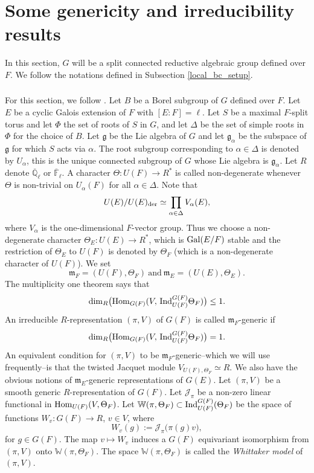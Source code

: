 \documentclass[10pt, reqno]{amsart}
\theoremstyle{plain}
\numberwithin{equation}{section} \newcommand{\di}{\operatorname{dim}}
\begin{document}
\section{Some genericity and irreducibility results}\label{sec_gen_irr}
\label{Tate_generic_subsection}
In this section, $G$ will be a
split connected reductive algebraic group defined over $F$. We follow the
notations defined in Subsection \ref{local_bc_setup}.
\subsubsection{}
For this section, we follow \cite{Derived_subgroups_Henniart_Bushnell}. 
Let $B$ be a Borel subgroup of $G$ defined over $F$.
Let $E$ be a cyclic Galois extension of $F$ with $[E:F]=\ell$.
Let $S$ be a maximal $F$-split torus and let $\Phi$ the set of roots
of $S$ in  $G$, and let $\Delta$ be the set of simple roots in
$\Phi$ for the choice of $B$. Let $\mathfrak{g}$ be the Lie algebra of
$G$ and let $\mathfrak{g}_\alpha$ be the subspace of $\mathfrak{g}$
for which $S$ acts via $\alpha$. The root subgroup corresponding to
$\alpha\in \Delta$ is denoted by $U_{\alpha}$, this is the unique
connected subgroup of $G$ whose Lie algebra is 
$\mathfrak{g}_\alpha$. Let $R$ denote $\overline{\mathbb{Q}}_\ell$ or
$\overline{\mathbb{F}}_\ell$. A character $\Theta :U(F)\rightarrow
R^\ast$ is called non-degenerate whenever $\Theta$ is non-trivial
on $U_{\alpha}(F)$ for all $\alpha\in \Delta$. Note that
$$U(E)/U(E)_{\rm der}\simeq \prod_{\alpha\in
  \Delta}V_\alpha(E),$$
  where $V_\alpha$ is the one-dimensional $F$-vector group.  Thus we choose a
non-degenerate character
$\Theta_E:U(E)\rightarrow R^\ast$,
which is ${\rm Gal}(E/F)$ stable and the restriction of $\Theta_E$ to
$U(F)$ is denoted by $\Theta_F$ (which is a non-degenerate
character of $U(F)$). We set
$$\mathfrak{m}_F=(U(F),\Theta_F)\ \text{and}\  \mathfrak{m}_E=(U(E),
\Theta_E).$$ 
The multiplicity one theorem says that
$$ {\rm dim}_R \big({\rm Hom}_{G(F)}(V,\,{\rm Ind}_{U(F)}^{G(F)}\Theta_F)\big)\leq 1. $$
An irreducible $R$-representation $(\pi,V)$ of $G(F)$ is called
$\mathfrak{m}_F$-generic if
$$ 
{\rm dim}_R\big({\rm Hom}_{G(F)}(V,\,{\rm
  Ind}_{U(F)}^{G(F)}\Theta_F)\big) = 1.
$$ 
An equivalent condition for $(\pi,V)$ to be
$\mathfrak{m}_F$-generic--which we will use frequently--is that the
twisted Jacquet module $V_{U(F),\Theta_F}\simeq R$. We also have
the obvious notions of $\mathfrak{m}_E$-generic representations of
$G(E)$.  Let $(\pi,V)$ be a smooth generic $R$-representation of
$G(F)$.  Let $\mathcal{J}_\pi$ be a non-zero linear functional in
${\rm Hom}_{U(F)}(V,\Theta_F)$. Let
$\mathbb{W}(\pi,\Theta_F) \subset {\rm Ind}_{U(F)}^{G(F)}(\Theta_F)$
be the space of functions $W_v:G(F)\rightarrow R$, $v \in V$, where
$$ W_v(g) := \mathcal{J}_\pi
\big(\pi(g)v\big), $$
for $g \in G(F)$. The map $v\mapsto W_v$
induces a $G(F)$
equivariant isomorphism from
$(\pi,V)$ onto $\mathbb{W}(\pi,\Theta_F)$.
The space 
$\mathbb{W}(\pi,\Theta_F)$ is
called the {\it Whittaker model} of
$(\pi,V)$.
\end{document}
